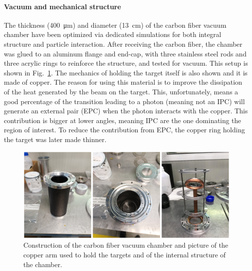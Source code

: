 \begin{refsection}
        \paragraph{Vacuum and mechanical structure}
        The thickness  (\SI{400}{\micro\meter}) and diameter (\SI{13}{cm}) of the carbon fiber vacuum chamber have been optimized via dedicated simulations for both integral structure and particle interaction.
        After receiving the carbon fiber, the chamber was glued to an aluminum flange and end-cap, with three stainless steel rods and three acrylic rings to reinforce the structure, and tested for vacuum.
        This setup is shown in Fig.~\ref{fig:X17:holder}.
        The mechanics of holding the target itself is also shown and it is made of copper.
        The reason for using this material is to improve the dissipation of the heat generated by the beam on the target.
        This, unfortunately, means a good percentage of the transition leading to a photon (meaning not an IPC) will generate an external pair (EPC) when the photon interacts with the copper.
        This contribution is bigger at lower angles, meaning IPC are the one dominating the region of interest.
        To reduce the contribution from EPC, the copper ring holding the target was later made thinner. 

        \begin{figure}
            \centering
            \includegraphics[width=\linewidth]{Figures/X17/X17_holder.png}
            \caption[X17: Vacuum chamber and target mechanics]{Construction of the carbon fiber vacuum chamber and picture of the copper arm used to hold the targets and of the internal structure of the chamber.}
            \label{fig:X17:holder}
        \end{figure}
        

\end{refsection}
